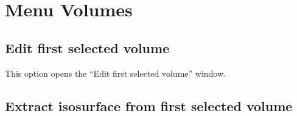 
\chapter{Menu Volumes}
\minitoc 

\section{Edit first selected volume}
This option opens the "`Edit first selected volume"' window.

\section{Extract isosurface from first selected volume}